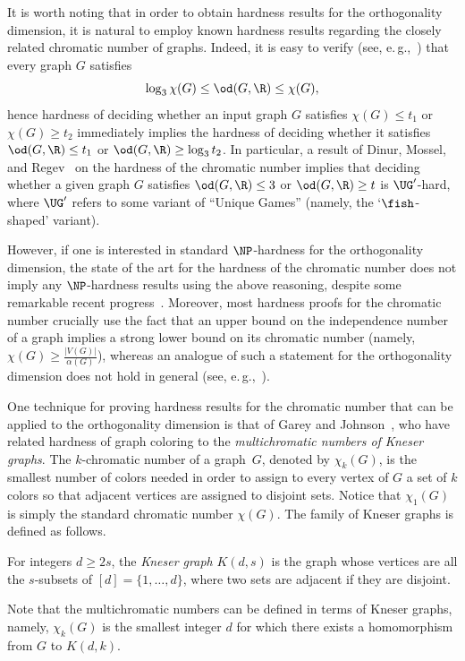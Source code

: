 It is worth noting that in order to obtain hardness results for the orthogonality dimension,
%
%
it is natural to employ known hardness results regarding the closely related chromatic number of graphs. Indeed, it is easy to verify (see, e.\,g.,~\cite{HavivMFCS19}) that every graph $G$ satisfies
\[\log_3 \chi(G) \leq \od(G,\R) \leq \chi(G),\]
hence hardness of deciding whether an input graph $G$ satisfies $\chi(G) \leq t_1$ or $\chi(G) \geq t_2$ immediately implies the hardness of deciding whether it satisfies $\od(G,\R) \leq t_1$ or $\od(G,\R) \geq \log_3 t_2$. In particular, a result of Dinur, Mossel, and Regev~\cite{DinurMR06} on the hardness of the chromatic number implies that %
%
%
%
deciding whether a given graph $G$ satisfies $\od(G,\R) \leq 3$ or $\od(G,\R) \geq t$
%
%
%
%
%
is $\UG'$-hard, where $\UG'$ refers to some variant of
``Unique Games'' (namely, the `$\fish$-shaped' variant). %

However, if one is interested in standard $\NP$-hardness for the orthogonality dimension, the state of the art for the hardness of the chromatic number does not imply
%
%
%
any $\NP$-hardness  %
results using the above reasoning, despite some remarkable recent progress~\cite{BartoBKO21,WZ20}.
Moreover, most hardness proofs for the chromatic number crucially use the fact that an upper bound on the independence number of a graph implies a strong lower bound on its chromatic number (namely, $\chi(G) \geq \frac{|V(G)|}{\alpha(G)}$), whereas an analogue of such a statement for the orthogonality dimension does not hold in general (see, e.\,g.,~\cite[Proposition~2.2]{HavivMFCS19}).

One technique for proving hardness results for the chromatic number that can be applied %
to  %
the orthogonality dimension is that of Garey and Johnson~\cite{GareyJ76a}, who have related hardness of graph coloring to the \emph{multichromatic numbers of Kneser graphs}. The
%
$k$-chromatic
number of a graph~$G$, denoted by $\chi_k(G)$, is the smallest number of colors needed in order to assign to every vertex of $G$ a set of $k$ colors so that adjacent vertices are assigned to disjoint sets. Notice that $\chi_1(G)$ is simply the standard chromatic number $\chi(G)$. The family of Kneser graphs is defined as follows.
\begin{definition}\label{def:Kneser}
For integers $d \geq 2s$, the \emph{Kneser graph} $K(d,s)$ is the graph whose vertices are all the $s$-subsets of $[d]=\{1,\ldots,d\}$, where two sets are adjacent if they are disjoint.
\end{definition}
\noindent
Note that the multichromatic numbers can be defined in terms of Kneser graphs, namely, $\chi_k(G)$ is the smallest integer $d$ for which there exists a homomorphism from $G$ to $K(d,k)$.

